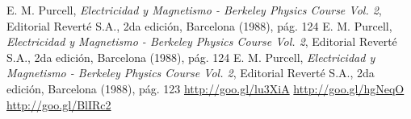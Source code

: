 \documentclass[twoside,twocolumn,a4paper]{article}
\begin{document}
\begin{thebibliography}{99} %

 E. M. Purcell, \textit{Electricidad y Magnetismo - Berkeley Physics Course Vol. 2}, Editorial Revert\'e S.A., 2da edici\'on, Barcelona (1988), p\'ag. 124
 E. M. Purcell, \textit{Electricidad y Magnetismo - Berkeley Physics Course Vol. 2}, Editorial Revert\'e S.A., 2da edici\'on, Barcelona (1988), p\'ag. 124
 E. M. Purcell, \textit{Electricidad y Magnetismo - Berkeley Physics Course Vol. 2}, Editorial Revert\'e S.A., 2da edici\'on, Barcelona (1988), p\'ag. 123
 \url{http://goo.gl/lu3XiA}
 \url{http://goo.gl/hgNeqO}
 \url{http://goo.gl/BlIRc2}
 
\end{thebibliography}

\end{document}
